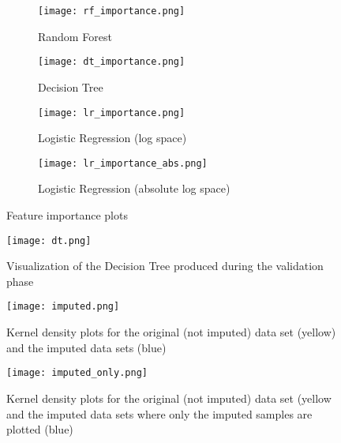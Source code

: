 \begin{figure}
 \begin{subfigure}{0.5\textwidth}
  \texttt{[image: rf\_importance.png]}
  \caption{Random Forest}
  \label{fig:rf_importance}
 \end{subfigure}
 \begin{subfigure}{0.5\textwidth}
  \texttt{[image: dt\_importance.png]}
  \caption{Decision Tree}
  \label{fig:dt_importance}
 \end{subfigure}
 \begin{subfigure}{0.5\textwidth}
  \texttt{[image: lr\_importance.png]}
  \caption{Logistic Regression (log space)}
  \label{fig:lr_importance}
 \end{subfigure}
 \begin{subfigure}{0.5\textwidth}
  \texttt{[image: lr\_importance\_abs.png]}
  \caption{Logistic Regression (absolute log space)}
  \label{fig:lr_importance_abs}
 \end{subfigure}

 \caption{Feature importance plots}
 \label{fig:feature-importance}
\end{figure}
\begin{figure}
 \texttt{[image: dt.png]}
 \caption{Visualization of the Decision Tree produced during the validation 
phase}
 \label{fig:dt}
\end{figure}
\begin{figure}
 \texttt{[image: imputed.png]}
 \caption{Kernel density plots for the original (not imputed) data set (yellow) 
and the imputed data sets (blue)}
\label{fig:imputed}
\end{figure}
\begin{figure}
 \texttt{[image: imputed\_only.png]}
  \caption{Kernel density plots for the original (not imputed) data set 
(yellow and the imputed data sets where only the imputed samples are plotted 
(blue)}
\label{fig:imputed-only}
\end{figure}




